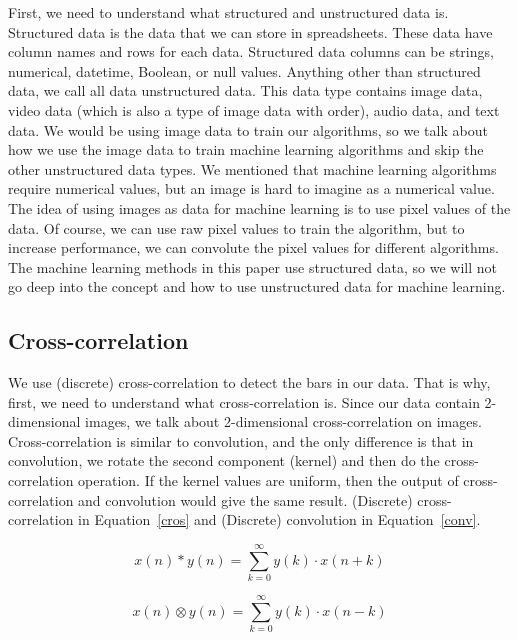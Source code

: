 First, we need to understand what structured and unstructured data is. Structured data is the data that we can store in spreadsheets. These data have column names and rows for each data. Structured data columns can be strings, numerical, datetime, Boolean, or null values. Anything other than structured data, we call all data unstructured data. This data type contains image data, video data (which is also a type of image data with order), audio data, and text data. We would be using image data to train our algorithms, so we talk about how we use the image data to train machine learning algorithms and skip the other unstructured data types. We mentioned that machine learning algorithms require numerical values, but an image is hard to imagine as a numerical value. The idea of using images as data for machine learning is to use pixel values of the data. Of course, we can use raw pixel values to train the algorithm, but to increase performance, we can convolute the pixel values for different algorithms. The machine learning methods in this paper use structured data, so we will not go deep into the concept and how to use unstructured data for machine learning.

\subsection{Cross-correlation}

We use (discrete) cross-correlation to detect the bars in our data. That is why, first, we need to understand what cross-correlation is. Since our data contain 2-dimensional images, we talk about 2-dimensional cross-correlation on images. Cross-correlation is similar to convolution, and the only difference is that in convolution, we rotate the second component (kernel) and then do the cross-correlation operation. If the kernel values are uniform, then the output of cross-correlation and convolution would give the same result. (Discrete) cross-correlation in Equation~\eqref{cros} and (Discrete) convolution in Equation~\eqref{conv}.
\vspace{10pt}


    \begin{equation}
x(n) \ast y(n) = \sum_{k=0}^{\infty}y(k)\cdot x(n+k)\label{cros}
    \end{equation}

    \begin{equation}
x(n) \otimes y(n) = \sum_{k=0}^{\infty}y(k)\cdot x(n-k)\label{conv}
    \end{equation}
\vspace{10pt}


